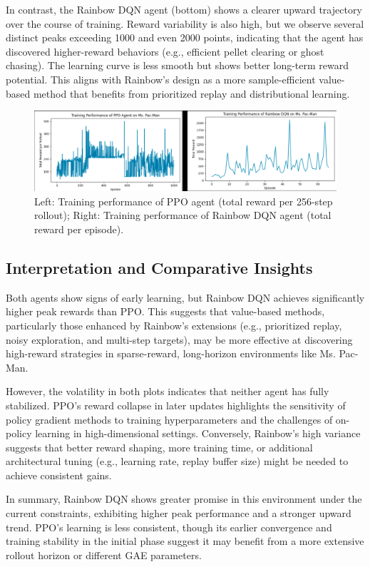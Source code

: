 \documentclass{article}
\begin{document}
In contrast, the Rainbow DQN agent (bottom) shows a clearer upward trajectory over the course of training. Reward variability is also high, but we observe several distinct peaks exceeding 1000 and even 2000 points, indicating that the agent has discovered higher-reward behaviors (e.g., efficient pellet clearing or ghost chasing). The learning curve is less smooth but shows better long-term reward potential. This aligns with Rainbow’s design as a more sample-efficient value-based method that benefits from prioritized replay and distributional learning.

\begin{figure}[h]
    \centering
    \includegraphics[width=0.85\linewidth]{rainbow_vs_ppo.png}
    \caption{Left: Training performance of PPO agent (total reward per 256-step rollout); Right: Training performance of Rainbow DQN agent (total reward per episode).}
    \label{fig:ppo_vs_rainbow}
\end{figure}

\subsection{Interpretation and Comparative Insights}

Both agents show signs of early learning, but Rainbow DQN achieves significantly higher peak rewards than PPO. This suggests that value-based methods, particularly those enhanced by Rainbow’s extensions (e.g., prioritized replay, noisy exploration, and multi-step targets), may be more effective at discovering high-reward strategies in sparse-reward, long-horizon environments like Ms. Pac-Man.

However, the volatility in both plots indicates that neither agent has fully stabilized. PPO’s reward collapse in later updates highlights the sensitivity of policy gradient methods to training hyperparameters and the challenges of on-policy learning in high-dimensional settings. Conversely, Rainbow’s high variance suggests that better reward shaping, more training time, or additional architectural tuning (e.g., learning rate, replay buffer size) might be needed to achieve consistent gains.

In summary, Rainbow DQN shows greater promise in this environment under the current constraints, exhibiting higher peak performance and a stronger upward trend. PPO’s learning is less consistent, though its earlier convergence and training stability in the initial phase suggest it may benefit from a more extensive rollout horizon or different GAE parameters.
\end{document}
